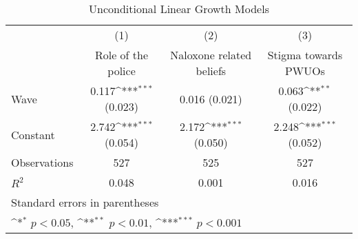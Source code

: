 \begin{table}[htbp]\centering
\def\sym#1{\ifmmode^{#1}\else\(^{#1}\)\fi}
\caption{\centering Unconditional Linear Growth Models}
\begin{tabular}{l*{3}{c}}
\toprule
                &\multicolumn{1}{c}{(1)}&\multicolumn{1}{c}{(2)}&\multicolumn{1}{c}{(3)}\\
                &\multicolumn{1}{c}{Role of the police}&\multicolumn{1}{c}{Naloxone related beliefs}&\multicolumn{1}{c}{Stigma towards PWUOs}\\
\midrule
Wave            &0.117\sym{***} (0.023)         &0.016 (0.021)         &0.063\sym{**} (0.022)         \\
\addlinespace
Constant        &2.742\sym{***} (0.054)         &2.172\sym{***} (0.050)         &2.248\sym{***} (0.052)         \\
\midrule
Observations    &      527         &      525         &      527         \\
\(R^{2}\)       &    0.048         &    0.001         &    0.016         \\
\bottomrule
\multicolumn{4}{l}{\footnotesize Standard errors in parentheses}\\
\multicolumn{4}{l}{\footnotesize \sym{*} \(p<0.05\), \sym{**} \(p<0.01\), \sym{***} \(p<0.001\)}\\
\end{tabular}
\end{table}
